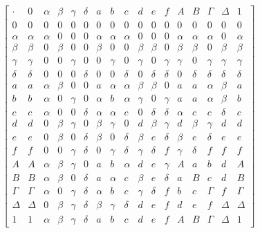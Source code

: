 \documentclass[
]{article}
\begin{document}
\[\begin{bmatrix}
 \cdot & 0 & \alpha & \beta & \gamma & \delta & a & b & c & d & e & f & Α & Β & \Gamma & \Delta & 1 \\
0 & 0 & 0 & 0 & 0 & 0 & 0 & 0 & 0 & 0 & 0 & 0 & 0 & 0 & 0 & 0 & 0 \\
\alpha & \alpha & \alpha & 0 & 0 & 0 & \alpha & \alpha & \alpha & 0 & 0 & 0 & \alpha & \alpha & \alpha & 0 & \alpha \\
\beta & \beta & 0 & \beta & 0 & 0 & \beta & 0 & 0 & \beta & \beta & 0 & \beta & \beta & 0 & \beta & \beta \\
\gamma & \gamma & 0 & 0 & \gamma & 0 & 0 & \gamma & 0 & \gamma & 0 & \gamma & \gamma & 0 & \gamma & \gamma & \gamma \\
\delta & \delta & 0 & 0 & 0 & \delta & 0 & 0 & \delta & 0 & \delta & \delta & 0 & \delta & \delta & \delta & \delta \\
a & a & \alpha & \beta & 0 & 0 & a & \alpha & \alpha & \beta & \beta & 0 & a & a & \alpha & \beta & a \\
b & b & \alpha & 0 & \gamma & 0 & \alpha & b & \alpha & \gamma & 0 & \gamma & a & a & \alpha & \beta & b \\
c & c & \alpha & 0 & 0 & \delta & \alpha & \alpha & c & 0 & \delta & \delta & \alpha & c & c & \delta & c \\
d & d & 0 & \beta & \gamma & 0 & \beta & \gamma & 0 & d & \beta & \gamma & d & \beta & \gamma & d & d \\
e & e & 0 & \beta & 0 & \delta & \beta & 0 & \delta & \beta & e & \delta & \beta & e & \delta & e & e \\
f & f & 0 & 0 & \gamma & \delta & 0 & \gamma & \delta & \gamma & \delta & f & \gamma & \delta & f & f & f \\
Α & Α & \alpha & \beta & \gamma & 0 & a & b & \alpha & d & e & \gamma & Α & a & b & d & Α \\
Β & Β & \alpha & \beta & 0 & \delta & a & \alpha & c & \beta & e & \delta & a & Β & c & d & Β \\
\Gamma & \Gamma & \alpha & 0 & \gamma & \delta & \alpha & b & c & \gamma & \delta & f & b & c & \Gamma & f & \Gamma \\
\Delta & \Delta & 0 & \beta & \gamma & \delta & \beta & \gamma & \delta & d & e & f & d & e & f & \Delta & \Delta \\
1 & 1 & \alpha & \beta & \gamma & \delta & a & b & c & d & e & f & Α & Β & \Gamma & \Delta & 1
\end{bmatrix}\]
\end{document}
